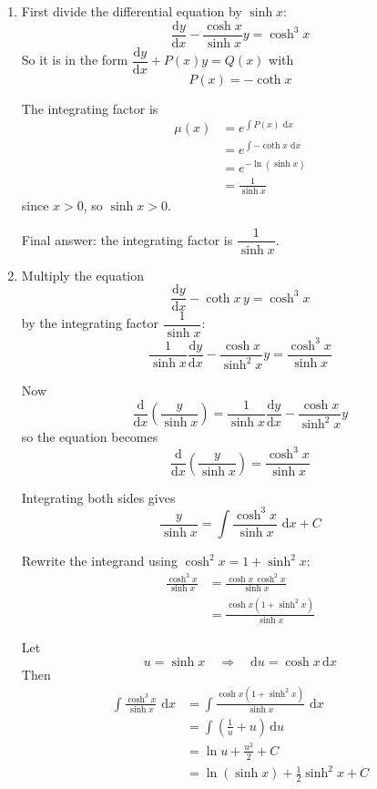 \documentclass[leqno]{article}
\begin{document}
\begin{enumerate}[
  label=\textbf{\arabic*.},
  leftmargin=*,
  topsep=0pt,
  partopsep=0pt,
  parsep=0pt
]
\vspace*{30pt}

\begin{tcolorbox}[colback=white, colframe=scarlet, title={\textbf{Solution}}, breakable, grow to left by=6mm, grow to right by=10mm]
\begin{enumerate}[label=\textbf{(\alph*)}]
  \item First divide the differential equation by \(\sinh x\):
\[
\frac{\mathrm{d}y}{\mathrm{d}x}-\frac{\cosh x}{\sinh x}y=\cosh^3 x
\]
So it is in the form \(\dfrac{\mathrm{d}y}{\mathrm{d}x}+P(x)y=Q(x)\) with
\[
P(x)=-\coth x
\]

The integrating factor is
\begin{align*}
\mu(x)
&=e^{\int P(x)\,\,\mathrm{d}x} \\
&=e^{\int -\coth x\,\,\mathrm{d}x} \\
&=e^{-\ln(\sinh x)} \\
&=\frac{1}{\sinh x}
\end{align*}
since \(x>0\), so \(\sinh x>0\).

Final answer: the integrating factor is \(\dfrac{1}{\sinh x}\).

  \item Multiply the equation
\[
\frac{\mathrm{d}y}{\mathrm{d}x}-\coth x\,y=\cosh^3 x
\]
by the integrating factor \(\dfrac{1}{\sinh x}\):
\[
\frac{1}{\sinh x}\frac{\mathrm{d}y}{\mathrm{d}x}-\frac{\cosh x}{\sinh^2 x}y=\frac{\cosh^3 x}{\sinh x}
\]

Now
\[
\frac{\mathrm{d}}{\mathrm{d}x}\left(\frac{y}{\sinh x}\right)
=\frac{1}{\sinh x}\frac{\mathrm{d}y}{\mathrm{d}x}-\frac{\cosh x}{\sinh^2 x}y
\]
so the equation becomes
\[
\frac{\mathrm{d}}{\mathrm{d}x}\left(\frac{y}{\sinh x}\right)=\frac{\cosh^3 x}{\sinh x}
\]

Integrating both sides gives
\[
\frac{y}{\sinh x}=\int \frac{\cosh^3 x}{\sinh x}\,\,\mathrm{d}x+C
\]

Rewrite the integrand using \(\cosh^2 x=1+\sinh^2 x\):
\begin{align*}
\frac{\cosh^3 x}{\sinh x}
&=\frac{\cosh x\,\cosh^2 x}{\sinh x} \\
&=\frac{\cosh x(1+\sinh^2 x)}{\sinh x}
\end{align*}

Let
\[
u=\sinh x
\quad\Rightarrow\quad
\mathrm{d}u=\cosh x\,\mathrm{d}x
\]
Then
\begin{align*}
\int \frac{\cosh^3 x}{\sinh x}\,\,\mathrm{d}x
&=\int \frac{\cosh x(1+\sinh^2 x)}{\sinh x}\,\,\mathrm{d}x \\
&=\int \left(\frac{1}{u}+u\right)\,\mathrm{d}u \\
&=\ln u+\frac{u^2}{2}+C \\
&=\ln(\sinh x)+\frac{1}{2}\sinh^2 x+C
\end{align*}


\end{enumerate}
\end{tcolorbox}
\end{enumerate}
\end{document}
